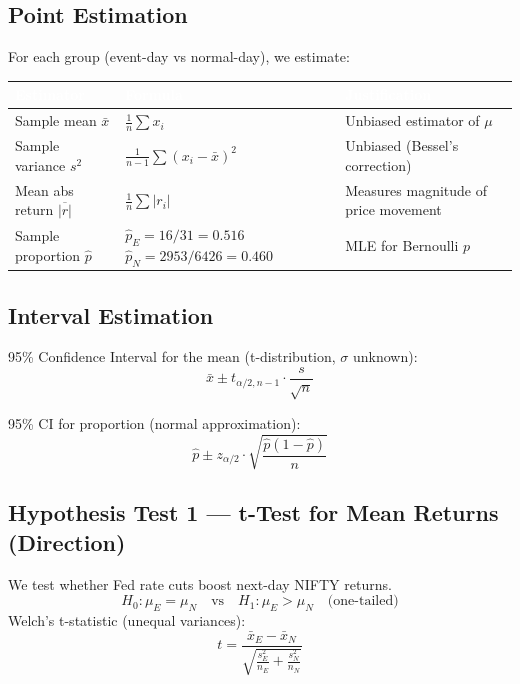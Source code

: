\documentclass[12pt,a4paper]{article}
\begin{document}
\subsection{Point Estimation}
For each group (event-day vs normal-day), we estimate:
\begin{table}[H]
\centering
\begin{tabularx}{\textwidth}{|l|X|X|}
\hline
\rowcolor{hdrbg} \textcolor{white}{\textbf{Estimator}} & \textcolor{white}{\textbf{Formula}} & \textcolor{white}{\textbf{Justification}} \\
\hline
Sample mean $\bar{x}$ & $\frac{1}{n} \sum x_i$ & Unbiased estimator of $\mu$ \\
\hline
\rowcolor{rowalt}
Sample variance $s^2$ & $\frac{1}{n-1} \sum (x_i - \bar{x})^2$ & Unbiased (Bessel's correction) \\
\hline
Mean abs return $\overline{|r|}$ & $\frac{1}{n} \sum |r_i|$ & Measures magnitude of price movement \\
\hline
\rowcolor{rowalt}
Sample proportion $\hat{p}$ & $\hat{p}_E = 16/31 = 0.516$ \newline $\hat{p}_N = 2953/6426 = 0.460$ & MLE for Bernoulli $p$ \\
\hline
\end{tabularx}
\end{table}

\subsection{Interval Estimation}
95\% Confidence Interval for the mean (t-distribution, $\sigma$ unknown):
\begin{equation*}
    \bar{x} \pm t_{\alpha/2, n-1} \cdot \frac{s}{\sqrt{n}}
\end{equation*}

95\% CI for proportion (normal approximation):
\begin{equation*}
    \hat{p} \pm z_{\alpha/2} \cdot \sqrt{\frac{\hat{p}(1-\hat{p})}{n}}
\end{equation*}

\subsection{Hypothesis Test 1 --- t-Test for Mean Returns (Direction)}
We test whether Fed rate cuts boost next-day NIFTY returns.
\begin{equation*}
    H_0: \mu_E = \mu_N \quad \text{vs} \quad H_1: \mu_E > \mu_N \quad \text{(one-tailed)}
\end{equation*}
Welch's t-statistic (unequal variances):
\begin{equation*}
    t = \frac{\bar{x}_E - \bar{x}_N}{\sqrt{\frac{s_E^2}{n_E} + \frac{s_N^2}{n_N}}}
\end{equation*}
\end{document}
